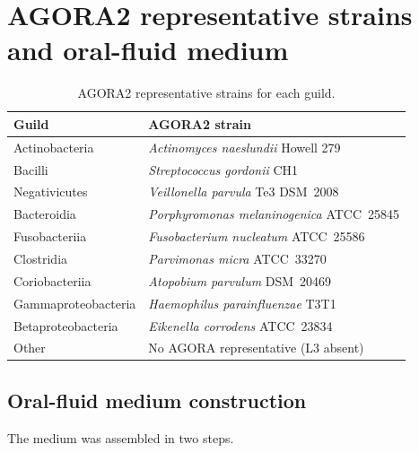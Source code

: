 \documentclass[11pt,a4paper]{article}
\begin{document}
\appendix

\section{AGORA2 representative strains and oral-fluid medium}
\label{app:agora}

\begin{table}[htb]
\centering
\caption{AGORA2 representative strains for each guild.}
\label{tab:agora_strains}
\small
\begin{tabular}{ll}
\toprule
Guild & AGORA2 strain \\
\midrule
Actinobacteria      & \textit{Actinomyces naeslundii} Howell 279 \\
Bacilli             & \textit{Streptococcus gordonii} CH1 \\
Negativicutes       & \textit{Veillonella parvula} Te3 DSM~2008 \\
Bacteroidia         & \textit{Porphyromonas melaninogenica} ATCC~25845 \\
Fusobacteriia       & \textit{Fusobacterium nucleatum} ATCC~25586 \\
Clostridia          & \textit{Parvimonas micra} ATCC~33270 \\
Coriobacteriia      & \textit{Atopobium parvulum} DSM~20469 \\
Gammaproteobacteria & \textit{Haemophilus parainfluenzae} T3T1 \\
Betaproteobacteria  & \textit{Eikenella corrodens} ATCC~23834 \\
Other               & No AGORA representative (L3 absent) \\
\bottomrule
\end{tabular}
\end{table}

\subsection*{Oral-fluid medium construction}

The medium was assembled in two steps.
\end{document}
